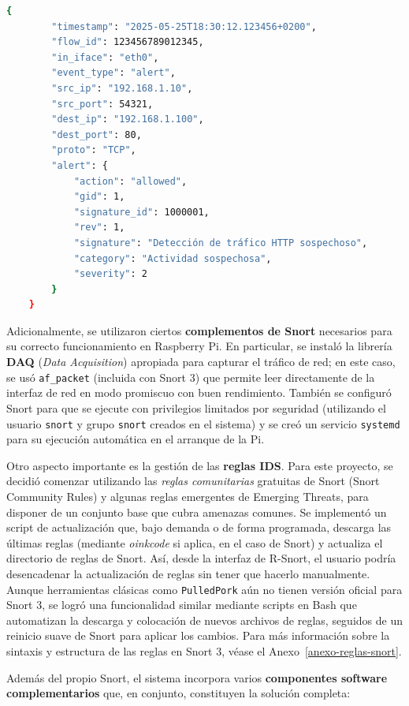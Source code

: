 \documentclass[11pt,a4paper,twoside]{report}
\newcounter{anexo}
\begin{document}
\begin{lstlisting}[language=bash,caption={Ejemplo de alerta en formato JSON generada por Snort 3.},label={lst:alerta-json}]
	{
		"timestamp": "2025-05-25T18:30:12.123456+0200",
		"flow_id": 123456789012345,
		"in_iface": "eth0",
		"event_type": "alert",
		"src_ip": "192.168.1.10",
		"src_port": 54321,
		"dest_ip": "192.168.1.100",
		"dest_port": 80,
		"proto": "TCP",
		"alert": {
			"action": "allowed",
			"gid": 1,
			"signature_id": 1000001,
			"rev": 1,
			"signature": "Detección de tráfico HTTP sospechoso",
			"category": "Actividad sospechosa",
			"severity": 2
		}
	}
\end{lstlisting}

Adicionalmente, se utilizaron ciertos \textbf{complementos de Snort} necesarios para su correcto funcionamiento en Raspberry Pi. En particular, se instaló la librería \textbf{DAQ} (\emph{Data Acquisition}) apropiada para capturar el tráfico de red; en este caso, se usó \texttt{af\_packet} (incluida con Snort 3) que permite leer directamente de la interfaz de red en modo promiscuo con buen rendimiento. También se configuró Snort para que se ejecute con privilegios limitados por seguridad (utilizando el usuario \texttt{snort} y grupo \texttt{snort} creados en el sistema) y se creó un servicio \texttt{systemd} para su ejecución automática en el arranque de la Pi.\newline

Otro aspecto importante es la gestión de las \textbf{reglas IDS}. Para este proyecto, se decidió comenzar utilizando las \emph{reglas comunitarias} gratuitas de Snort (Snort Community Rules) y algunas reglas emergentes de Emerging Threats, para disponer de un conjunto base que cubra amenazas comunes. Se implementó un script de actualización que, bajo demanda o de forma programada, descarga las últimas reglas (mediante \emph{oinkcode} si aplica, en el caso de Snort) y actualiza el directorio de reglas de Snort. Así, desde la interfaz de R-Snort, el usuario podría desencadenar la actualización de reglas sin tener que hacerlo manualmente. Aunque herramientas clásicas como \texttt{PulledPork} aún no tienen versión oficial para Snort 3, se logró una funcionalidad similar mediante scripts en Bash que automatizan la descarga y colocación de nuevos archivos de reglas, seguidos de un reinicio suave de Snort para aplicar los cambios. Para más información sobre la sintaxis y estructura de las reglas en Snort 3, véase el Anexo~\ref{anexo-reglas-snort}.

Además del propio Snort, el sistema incorpora varios \textbf{componentes software complementarios} que, en conjunto, constituyen la solución completa:\newline
\end{document}
